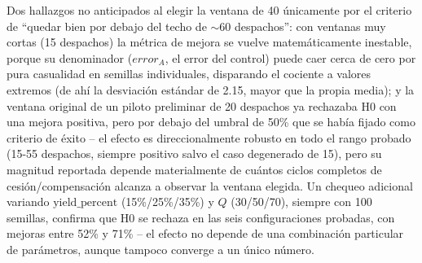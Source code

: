 Dos hallazgos no anticipados al elegir la ventana de 40 únicamente por el
criterio de ``quedar bien por debajo del techo de $\sim 60$ despachos'':
con ventanas muy cortas (15 despachos) la métrica de mejora se vuelve
matemáticamente inestable, porque su denominador ($error_A$, el error del
control) puede caer cerca de cero por pura casualidad en semillas
individuales, disparando el cociente a valores extremos (de ahí la
desviación estándar de 2.15, mayor que la propia media); y la ventana
original de un piloto preliminar de 20 despachos ya rechazaba H0 con una
mejora positiva, pero por debajo del umbral de 50\% que se había fijado
como criterio de éxito -- el efecto es direccionalmente robusto en todo el
rango probado (15-55 despachos, siempre positivo salvo el caso degenerado
de 15), pero su magnitud reportada depende materialmente de cuántos ciclos
completos de cesión/compensación alcanza a observar la ventana elegida.
Un chequeo adicional variando $\text{yield\_percent}$ (15\%/25\%/35\%) y
$Q$ (30/50/70), siempre con 100 semillas, confirma que H0 se rechaza en las
seis configuraciones probadas, con mejoras entre 52\% y 71\% -- el efecto
no depende de una combinación particular de parámetros, aunque tampoco
converge a un único número.
